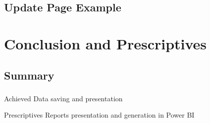\subsection{Update Page Example}
\begin{frame}[fragile=singleslide]{\insertsectionhead}
  \framesubtitle{\insertsubsectionhead}
  \begin{figure}[b]
  \end{figure}
\end{frame}

\section{Conclusion and Prescriptives}

\subsection{Summary}
\begin{frame}
  \frametitle{\insertsectionhead}
  \framesubtitle{\insertsubsectionhead}
  \begin{exampleblock}{Achieved}
    Data saving and presentation
  \end{exampleblock}
  \begin{alertblock}{Prescriptives}
    Reports presentation and generation in Power BI
  \end{alertblock}
\end{frame}
